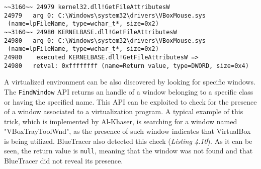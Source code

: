 \vspace{1cm}
\begin{lstlisting}[caption={ Log portion relative to the search for \texttt{VboxMouse.sys} search},captionpos=b]
~~3160~~ 24979 kernel32.dll!GetFileAttributesW
24979 	arg 0: C:\Windows\system32\drivers\VBoxMouse.sys
 (name=lpFileName, type=wchar_t*, size=0x2)
~~3160~~ 24980 KERNELBASE.dll!GetFileAttributesW
24980 	arg 0: C:\Windows\system32\drivers\VBoxMouse.sys
 (name=lpFileName, type=wchar_t*, size=0x2)
24980    executed KERNELBASE.dll!GetFileAttributesW =>
24980 	retval: 0xffffffff (name=Return value, type=DWORD, size=0x4)
\end{lstlisting}

\iffalse
-Registry Artifacts
-File system artifacts -> Virtual Devices here?
-Window
-DLLs
\fi

A virtualized environment can be also discovered by looking for specific windows. The \texttt{FindWindow} API returns an handle of a window belonging to a specific class or having the specified name. This API can be exploited to check for the presence of a window associated to a virtualization program. A typical example of this trick, which is implemented by Al-Khaser, is searching for a window named "VBoxTrayToolWnd", as the presence of such window indicates that VirtualBox is being utilized. BlueTracer also detected this check (\textit{Listing 4.10}). As it can be seen, the return value is \texttt{null}, meaning that the window was not found and that BlueTracer did not reveal its presence.

